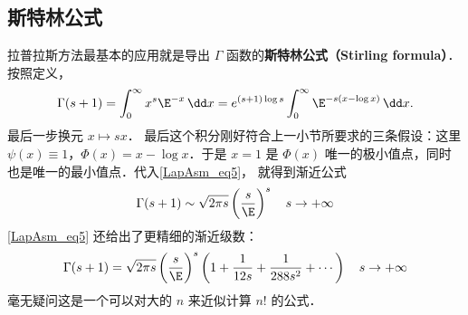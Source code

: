 \subsection{斯特林公式}
拉普拉斯方法最基本的应用就是导出 $\Gamma$ 函数的\textbf{斯特林公式（Stirling formula）}． 按照定义，
\[
  \Gamma(s+1)
  =\int_0^\infty x^s\E^{-x}\,\dd x
  =e^{(s+1)\log s}\int_0^\infty \E^{-s(x-\log x)}\,\dd x.
\]
最后一步换元 $x\mapsto sx$． 最后这个积分刚好符合上一小节所要求的三条假设：这里 $\psi(x)\equiv1$，$\Phi(x)=x-\log x$．于是 $x=1$ 是 $\Phi(x)$ 唯一的极小值点，同时也是唯一的最小值点．代入\autoref{LapAsm_eq5}， 就得到渐近公式
\[
  \Gamma(s+1)\sim\sqrt{2\pi s}\left(\frac{s}{\E}\right)^s\quad s\to+\infty
\]
\autoref{LapAsm_eq5} 还给出了更精细的渐近级数：
\[
  \Gamma(s+1)
  =\sqrt{2\pi s}\left({s\over \E}\right)^s
  \left(
   1
   +{1\over12s}
   +{1\over288 s^2}
   + \cdots
  \right)\quad s\to+\infty
\]
毫无疑问这是一个可以对大的 $n$ 来近似计算 $n!$ 的公式．
